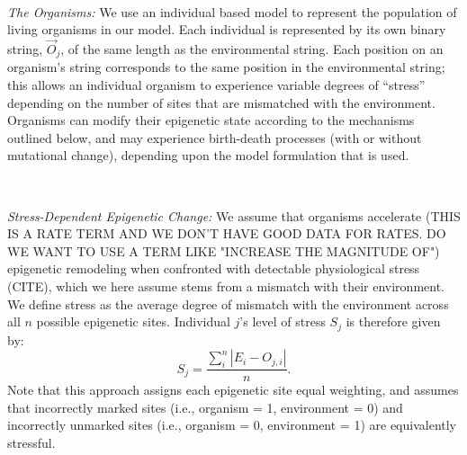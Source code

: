 \documentclass{article}
\begin{document}
\ 


\noindent \textit{The Organisms:} We use an individual based model to represent the population of living organisms in our model. Each individual is represented by its own binary string, $\vec{O}_j$, of the same length as the environmental string. Each position on an organism's string corresponds to the same position in the environmental string; this allows an individual organism to experience variable degrees of ``stress'' depending on the number of sites that are mismatched with the environment. Organisms can modify their epigenetic state according to the mechanisms outlined below, and may experience birth-death processes (with or without mutational change), depending upon the model formulation that is used. %

\ 

\noindent \textit{Stress-Dependent Epigenetic Change:} We assume that organisms accelerate (THIS IS A RATE TERM AND WE DON'T HAVE GOOD DATA FOR RATES. DO WE WANT TO USE A TERM LIKE "INCREASE THE MAGNITUDE OF") epigenetic remodeling when confronted with detectable physiological stress (CITE), which we here assume stems from a mismatch with their environment. We define stress as the average degree of mismatch with the environment across all $n$ possible epigenetic sites. Individual $j$'s level of stress $S_j$ is therefore given by:
\begin{equation}
   S_j = \frac{\sum_i ^n | E_i - O_{j,i} |}{n} .
\end{equation}
Note that this approach assigns each epigenetic site equal weighting, and assumes that incorrectly marked sites (i.e., organism = 1, environment = 0) and incorrectly unmarked sites (i.e., organism = 0, environment = 1) are equivalently stressful.
\end{document}
